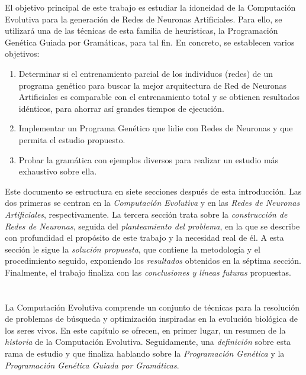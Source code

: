 \documentclass[spanish,a4paper,12pt,twoside]{report}
\begin{document}
  El objetivo principal de este trabajo es estudiar la idoneidad de la Computación Evolutiva para la generación de Redes de Neuronas Artificiales. Para ello, se utilizará una de las técnicas de esta familia de heurísticas, la Programación Genética Guiada por Gramáticas, para tal fin. En concreto, se establecen varios objetivos:
  \begin{enumerate}
    \item Determinar si el entrenamiento parcial de los individuos (redes) de un programa genético para buscar la mejor arquitectura de Red de Neuronas Artificiales es comparable con el entrenamiento total y se obtienen resultados idénticos, para ahorrar así grandes tiempos de ejecución.
    \item Implementar un Programa Genético que lidie con Redes de Neuronas y que permita el estudio propuesto.
    \item Probar la gramática con ejemplos diversos para realizar un estudio más exhaustivo sobre ella.
  \end{enumerate} \par
  Este documento se estructura en siete secciones después de esta introducción. Las dos primeras se centran en la \emph{Computación Evolutiva} y en las \emph{Redes de Neuronas Artificiales}, respectivamente. La tercera sección trata sobre la \emph{construcción de Redes de Neuronas}, seguida del \emph{planteamiento del problema}, en la que se describe con profundidad el propósito de este trabajo y la necesidad real de él. A esta sección le sigue la \emph{solución propuesta}, que contiene la metodología y el procedimiento seguido, exponiendo los \emph{resultados} obtenidos en la séptima sección. Finalmente, el trabajo finaliza con las \emph{conclusiones y líneas futuras} propuestas. \par
  
  \chapter{\vspace{-3cm}{\LARGE 2. Computación Evolutiva}}
  \vspace{-1cm}
  La Computación Evolutiva comprende un conjunto de técnicas para la resolución de problemas de búsqueda y optimización inspiradas en la evolución biológica de los seres vivos. En este capítulo se ofrecen, en primer lugar, un resumen de la \emph{historia} de la Computación Evolutiva. Seguidamente, una \emph{definición} sobre esta rama de estudio y que finaliza hablando sobre la \emph{Programación Genética} y la \emph{Programación Genética Guiada por Gramáticas}.
\end{document}

